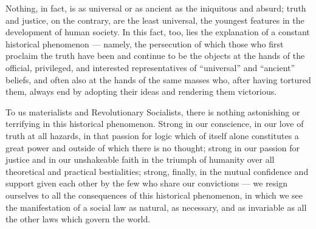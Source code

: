 \documentclass[12pt]{report}
\begin{document}
Nothing, in fact, is as universal or as ancient as the iniquitous and absurd; truth and justice, on the contrary, are the least universal, the youngest features in the development of human society. In this fact, too, lies the explanation of a constant historical phenomenon — namely, the persecution of which those who first proclaim the truth have been and continue to be the objects at the hands of the official, privileged, and interested representatives of “universal” and “ancient” beliefs, and often also at the hands of the same masses who, after having tortured them, always end by adopting their ideas and rendering them victorious.


To us materialists and Revolutionary Socialists, there is nothing astonishing or terrifying in this historical phenomenon. Strong in our conscience, in our love of truth at all hazards, in that passion for logic which of itself alone constitutes a great power and outside of which there is no thought; strong in our passion for justice and in our unshakeable faith in the triumph of humanity over all theoretical and practical bestialities; strong, finally, in the mutual confidence and support given each other by the few who share our convictions — we resign ourselves to all the consequences of this historical phenomenon, in which we see the manifestation of a social law as natural, as necessary, and as invariable as all the other laws which govern the world.
\end{document}
